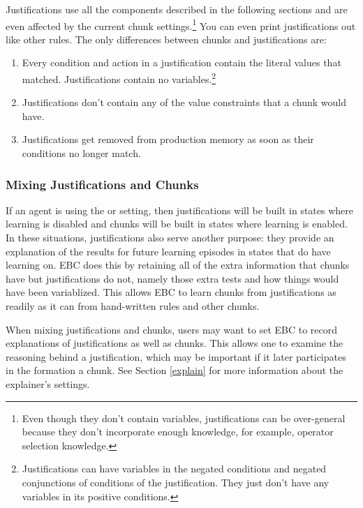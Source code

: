 Justifications use all the components described in the following sections and are even affected by the current chunk settings.\footnote{
	Even though they don't contain variables, justifications can be over-general because they don't incorporate enough knowledge, for example, operator selection knowledge.}
 You can even print justifications out like other rules.  The only differences between chunks and justifications are:
 
 \begin{enumerate}
	\item Every condition and action in a justification contain the literal values that matched.  Justifications contain no variables.\footnote{
		Justifications can have variables in the negated conditions and negated conjunctions of conditions of the justification.  They just don't have any variables in its positive conditions.}
	\item Justifications don't contain any of the value constraints that a chunk would have.
	\item Justifications get removed from production memory as soon as their conditions no longer match. 
 \end{enumerate}

 \subsubsection{Mixing Justifications and Chunks}
 
If an agent is using the  or  setting, then justifications will be built in states where learning is disabled and chunks will be built in states where learning is enabled.  In these situations, justifications also serve another purpose:  they provide an explanation of the results for future learning episodes in states that do have learning on.  EBC does this by retaining all of the extra information that chunks have but justifications do not, namely those extra tests and how things would have been variablized.  This allows EBC to learn chunks from justifications as readily as it can from hand-written rules and other chunks.

When mixing justifications and chunks, users may want to set EBC to record explanations of justifications as well as chunks.  This allows one to examine the reasoning behind a justification, which may be important if it later participates in the formation a chunk. See Section \ref{explain} for more information about the explainer's settings.


